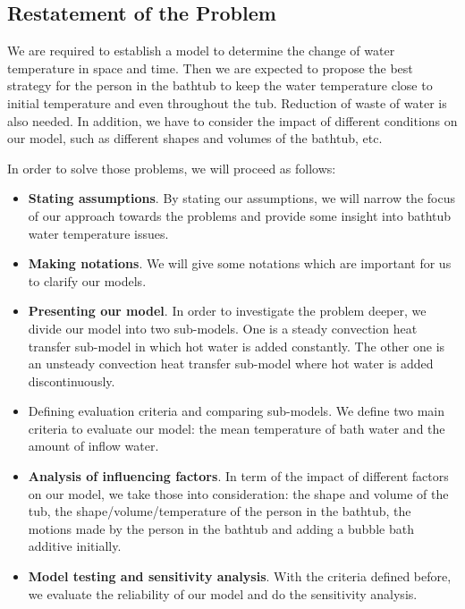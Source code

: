 \documentclass{mcmthesis}
\begin{document}
\subsection{Restatement of the Problem}

We are required to establish a model to determine the change of water temperature 
in space and time. Then we are expected to propose the best strategy for the 
person in the bathtub to keep the water temperature close to initial temperature 
and even throughout the tub. Reduction of waste of water is also needed. In 
addition, we have to consider the impact of different conditions on our model, 
such as different shapes and volumes of the bathtub, etc.

In order to solve those problems, we will proceed as follows:

\begin{itemize}
\item {\bf Stating assumptions}. By stating our assumptions, we will narrow the 
focus of our approach towards the problems and provide some insight into bathtub 
water temperature issues.

\item {\bf Making notations}. We will give some notations which are important for 
us to clarify our models.

\item {\bf Presenting our model}. In order to investigate the problem deeper, we 
divide our model into two sub-models. One is a steady convection heat transfer 
sub-model in which hot water is added constantly. The other one is an unsteady 
convection heat transfer sub-model where hot water is added discontinuously.

\item {Defining evaluation criteria and comparing sub-models}. We define two main 
criteria to evaluate our model: the mean temperature of bath water and the amount 
of inflow water.

\item {\bf Analysis of influencing factors}. In term of the impact of different 
factors on our model, we take those into consideration: the shape and volume of 
the tub, the shape/volume/temperature of the person in the bathtub, the motions 
made by the person in the bathtub and adding a bubble bath additive initially.

\item {\bf Model testing and sensitivity analysis}. With the criteria defined 
before, we evaluate the reliability of our model and do the sensitivity analysis.


\end{itemize}
\end{document}
